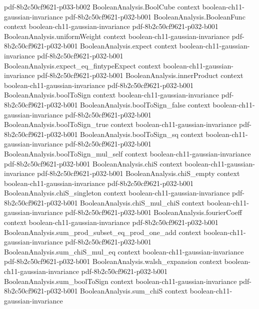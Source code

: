 \begin{theorem}
  {pdf-8b2c50cf9621-p033-b002}
\proofstep
  {BooleanAnalysis.BoolCube}
  {context}
  {boolean-ch11-gaussian-invariance}
  {pdf-8b2c50cf9621-p032-b001}
\proofstep
  {BooleanAnalysis.BooleanFunc}
  {context}
  {boolean-ch11-gaussian-invariance}
  {pdf-8b2c50cf9621-p032-b001}
\proofstep
  {BooleanAnalysis.uniformWeight}
  {context}
  {boolean-ch11-gaussian-invariance}
  {pdf-8b2c50cf9621-p032-b001}
\proofstep
  {BooleanAnalysis.expect}
  {context}
  {boolean-ch11-gaussian-invariance}
  {pdf-8b2c50cf9621-p032-b001}
\proofstep
  {BooleanAnalysis.expect_eq_fintypeExpect}
  {context}
  {boolean-ch11-gaussian-invariance}
  {pdf-8b2c50cf9621-p032-b001}
\proofstep
  {BooleanAnalysis.innerProduct}
  {context}
  {boolean-ch11-gaussian-invariance}
  {pdf-8b2c50cf9621-p032-b001}
\proofstep
  {BooleanAnalysis.boolToSign}
  {context}
  {boolean-ch11-gaussian-invariance}
  {pdf-8b2c50cf9621-p032-b001}
\proofstep
  {BooleanAnalysis.boolToSign_false}
  {context}
  {boolean-ch11-gaussian-invariance}
  {pdf-8b2c50cf9621-p032-b001}
\proofstep
  {BooleanAnalysis.boolToSign_true}
  {context}
  {boolean-ch11-gaussian-invariance}
  {pdf-8b2c50cf9621-p032-b001}
\proofstep
  {BooleanAnalysis.boolToSign_sq}
  {context}
  {boolean-ch11-gaussian-invariance}
  {pdf-8b2c50cf9621-p032-b001}
\proofstep
  {BooleanAnalysis.boolToSign_mul_self}
  {context}
  {boolean-ch11-gaussian-invariance}
  {pdf-8b2c50cf9621-p032-b001}
\proofstep
  {BooleanAnalysis.chiS}
  {context}
  {boolean-ch11-gaussian-invariance}
  {pdf-8b2c50cf9621-p032-b001}
\proofstep
  {BooleanAnalysis.chiS_empty}
  {context}
  {boolean-ch11-gaussian-invariance}
  {pdf-8b2c50cf9621-p032-b001}
\proofstep
  {BooleanAnalysis.chiS_singleton}
  {context}
  {boolean-ch11-gaussian-invariance}
  {pdf-8b2c50cf9621-p032-b001}
\proofstep
  {BooleanAnalysis.chiS_mul_chiS}
  {context}
  {boolean-ch11-gaussian-invariance}
  {pdf-8b2c50cf9621-p032-b001}
\proofstep
  {BooleanAnalysis.fourierCoeff}
  {context}
  {boolean-ch11-gaussian-invariance}
  {pdf-8b2c50cf9621-p032-b001}
\proofstep
  {BooleanAnalysis.sum_prod_subset_eq_prod_one_add}
  {context}
  {boolean-ch11-gaussian-invariance}
  {pdf-8b2c50cf9621-p032-b001}
\proofstep
  {BooleanAnalysis.sum_chiS_mul_eq}
  {context}
  {boolean-ch11-gaussian-invariance}
  {pdf-8b2c50cf9621-p032-b001}
\proofstep
  {BooleanAnalysis.walsh_expansion}
  {context}
  {boolean-ch11-gaussian-invariance}
  {pdf-8b2c50cf9621-p032-b001}
\proofstep
  {BooleanAnalysis.sum_boolToSign}
  {context}
  {boolean-ch11-gaussian-invariance}
  {pdf-8b2c50cf9621-p032-b001}
\proofstep
  {BooleanAnalysis.sum_chiS}
  {context}
  {boolean-ch11-gaussian-invariance}

\end{theorem}
